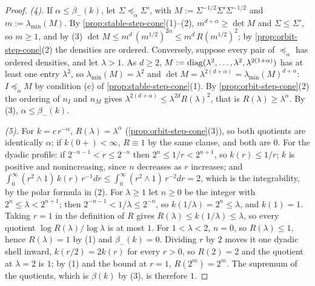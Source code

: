 \begin{proof}
\emph{(4).} If $\alpha \le \beta_-(k)$, let $\Sigma \preceq_\alpha \Sigma'$, with
$M := \Sigma^{-1/2}\Sigma'\Sigma^{-1/2}$ and $m := \lambda_{\min}(M)$. By \ref{prop:stable-step-cone}(1)--(2),
$m^{d+\alpha} \ge \det M$ and $\Sigma \le \Sigma'$, so $m \ge 1$, and by (3)
$\det M \le m^d\,(m^{1/2})^{2\alpha} \le m^d\,R(m^{1/2})^2$; by \ref{prop:orbit-step-cone}(2) the
densities are ordered. Conversely, suppose every pair of $\preceq_\alpha$ has ordered densities, and let
$\lambda > 1$. As $d \ge 2$, $M := \operatorname{diag}(\lambda^2, \dots, \lambda^2, \lambda^{2(1+\alpha)})$ has at least one
entry $\lambda^2$, so $\lambda_{\min}(M) = \lambda^2$ and $\det M = \lambda^{2(d+\alpha)} = \lambda_{\min}(M)^{d+\alpha}$:
$I \preceq_\alpha M$ by condition (c) of \ref{prop:stable-step-cone}(1). By \ref{prop:orbit-step-cone}(2) the
ordering of $n_I$ and $n_M$ gives $\lambda^{2(d+\alpha)} \le \lambda^{2d}R(\lambda)^2$, that is
$R(\lambda) \ge \lambda^\alpha$. By (3), $\alpha \le \beta_-(k)$.

\emph{(5).} For $k = c\,r^{-\alpha}$, $R(\lambda) = \lambda^\alpha$ (\ref{prop:orbit-step-cone}(3)), so both
quotients are identically $\alpha$; if $k(0{+}) < \infty$, $R \equiv 1$ by the same clause, and both are
$0$. For the dyadic profile: if $2^{-n-1} < r \le 2^{-n}$ then $2^{n} \le 1/r < 2^{n+1}$, so
$k(r) \le 1/r$; $k$ is positive and nonincreasing, since $n$ decreases as $r$ increases; and
$\int_0^\infty(r^2 \wedge 1)\,k(r)\,r^{-1}dr \le \int_0^\infty(r^2 \wedge 1)\,r^{-2}dr = 2$, which is the
integrability, by the polar formula in (2). For $\lambda \ge 1$ let $n \ge 0$ be the integer with
$2^n \le \lambda < 2^{n+1}$; then $2^{-n-1} < 1/\lambda \le 2^{-n}$, so $k(1/\lambda) = 2^n \le \lambda$,
and $k(1) = 1$. Taking $r = 1$ in the definition of $R$ gives $R(\lambda) \le k(1/\lambda) \le \lambda$,
so every quotient $\log R(\lambda)/\log\lambda$ is at most $1$. For $1 < \lambda < 2$, $n = 0$, so
$R(\lambda) \le 1$, hence $R(\lambda) = 1$ by (1) and $\beta_-(k) = 0$. Dividing $r$ by $2$ moves it one
dyadic shell inward, $k(r/2) = 2k(r)$ for every $r > 0$, so $R(2) = 2$ and the quotient at
$\lambda = 2$ is $1$; by (1) and the bound at $r = 1$, $R(2^m) = 2^m$. The supremum of the quotients,
which is $\beta(k)$ by (3), is therefore $1$.
\end{proof}

